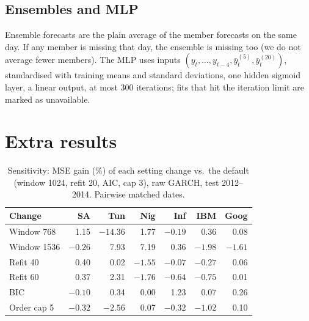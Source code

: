 \documentclass{article}
\begin{document}
\subsection{Ensembles and MLP}
Ensemble forecasts are the plain average of the member forecasts on the same day. If any member is missing that day, the ensemble is missing too (we do not average fewer members). The MLP uses inputs $(y_t,\dots,y_{t-4},\bar y^{(5)}_t,\bar y^{(20)}_t)$, standardised with training means and standard deviations, one hidden sigmoid layer, a linear output, at most 300 iterations; fits that hit the iteration limit are marked as unavailable.

\section{Extra results}

\begin{table}[t]
\caption{Sensitivity: MSE gain (\%) of each setting change vs.\ the default (window 1024, refit 20, AIC, cap 3), raw GARCH, test 2012--2014. Pairwise matched dates.}
\label{tab:sens}
\centering\small
\setlength{\tabcolsep}{2.5pt}
\begin{tabular}{lrrrrrr}
\toprule
Change & SA & Tun & Nig & Inf & IBM & Goog\\
\midrule
Window 768 & 1.15 & $-14.36$ & 1.77 & $-0.19$ & 0.36 & 0.08\\
Window 1536 & $-0.26$ & 7.93 & 7.19 & 0.36 & $-1.98$ & $-1.61$\\
Refit 40 & 0.40 & 0.02 & $-1.55$ & $-0.07$ & $-0.27$ & 0.06\\
Refit 60 & 0.37 & 2.31 & $-1.76$ & $-0.64$ & $-0.75$ & 0.01\\
BIC & $-0.10$ & 0.34 & 0.00 & 1.23 & 0.07 & 0.26\\
Order cap 5 & $-0.32$ & $-2.56$ & 0.07 & $-0.32$ & $-1.02$ & 0.10\\
\bottomrule
\end{tabular}
\end{table}
\end{document}
